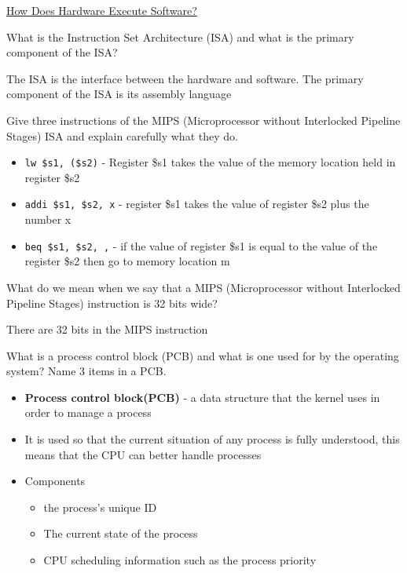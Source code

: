 \documentclass{exam}
\begin{document}
\begin{center}
	\underline{\huge How Does Hardware Execute Software?}
\end{center}
\begin{questions}

\question[3]What is the Instruction Set Architecture (ISA) and what is the primary component of the ISA?
\begin{solution}[2in]
	The ISA is the interface between the hardware and software. The primary component of the ISA is its assembly language
\end{solution}

\question[6]Give three instructions of the MIPS (Microprocessor without Interlocked Pipeline Stages) ISA and explain carefully what they do.
\begin{solution}[2in]
	\begin{itemize}
		\item \texttt{lw \$s1, (\$s2)} - Register \$s1 takes the value of the memory location held in register \$s2
		\item \texttt{addi \$s1, \$s2, x} - register \$s1 takes the value of register \$s2 plus the number x
		\item \texttt{beq \$s1, \$s2, ,} - if the value of register \$s1 is equal to the value of the register \$s2 then go to memory location m
	\end{itemize}
\end{solution}

\question[2]What do we mean when we say that a MIPS (Microprocessor without Interlocked Pipeline Stages) instruction is 32 bits wide?
\begin{solution}[2in]
	There are 32 bits in the MIPS instruction
\end{solution}

\question[6]What is a process control block (PCB) and what is one used for by the operating system? Name 3 items in a PCB.
\begin{solution}[2in]
	\begin{itemize}
		\item \textbf{Process control block(PCB)} - a data structure that the kernel uses in order to manage a process
		\item It is used so that the current situation of any process is fully understood, this means that the CPU can better handle processes
		\item Components
		\begin{itemize}
			\item the process's unique ID
			\item The current state of the process
			\item CPU scheduling information such as the process priority
		\end{itemize}
	\end{itemize}
\end{solution}



\end{questions}
\end{document}
